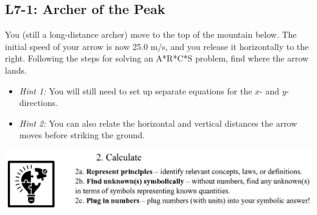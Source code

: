 \documentclass[]{article}
\begin{document}
\begin{PresentSpace}
	\vspace{-10pt}
	\section*{L7-1: Archer of the Peak}
	\vspace{-10pt}
	You (still a long-distance archer) move to the top of the mountain below. The initial speed of your arrow is now 25.0 m/s, and you release it horizontally to the right. Following the steps for solving an A*R*C*S problem, find where the arrow lands.
	\begin{itemize}
		\item \textit{Hint 1:} You will still need to set up separate equations for the $x$- and $y$-directions.
		\item \textit{Hint 2:} You can also relate the horizontal and vertical distances the arrow moves before striking the ground.
	\end{itemize}
	\begin{center}
	\end{center}
	\begin{center}
		\includegraphics[scale=0.4]{Calculate}
	\end{center}
\end{PresentSpace}
\newpage
\end{document}

